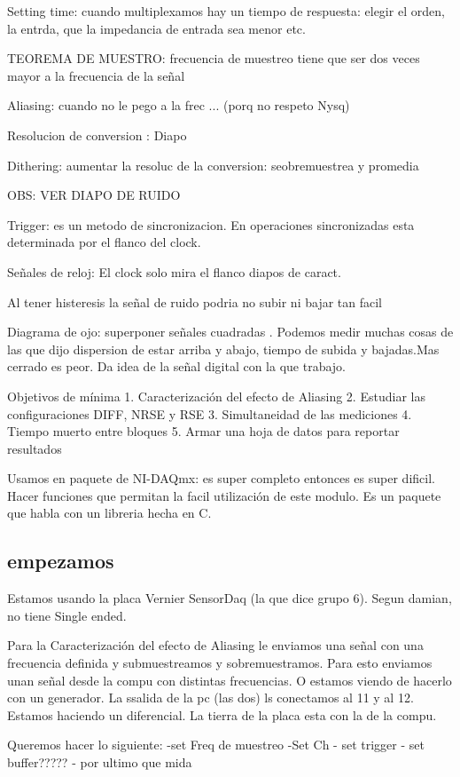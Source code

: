 \documentclass[a4paper,12pt]{article}
\begin{document}
Setting time:
cuando multiplexamos hay un tiempo de respuesta: elegir el orden, la entrda, que la impedancia de entrada sea menor etc. 

TEOREMA DE MUESTRO:
frecuencia de muestreo tiene que ser dos veces mayor a la frecuencia de la señal 

Aliasing: 
cuando no le pego a la frec ... (porq no respeto Nysq)

Resolucion de conversion :
Diapo

Dithering: 
aumentar la resoluc de la conversion: seobremuestrea y promedia 

OBS: VER DIAPO DE RUIDO 

Trigger: es un metodo de sincronizacion. En operaciones sincronizadas esta determinada por el flanco del clock. 

Señales de reloj: 
El clock solo mira el flanco 
diapos de caract. 

Al tener histeresis la señal de ruido podria no subir ni bajar tan facil 

Diagrama de ojo: superponer señales cuadradas . Podemos medir muchas cosas de las que dijo dispersion de estar arriba y abajo, tiempo de subida y bajadas.Mas cerrado es peor. Da idea de la señal digital con la que trabajo. 

Objetivos de mínima
1. Caracterización del efecto de Aliasing
2. Estudiar las configuraciones DIFF, NRSE y RSE
3. Simultaneidad de las mediciones
4. Tiempo muerto entre bloques
5. Armar una hoja de datos para reportar resultados


Usamos en paquete de NI-DAQmx: es super completo entonces es super dificil. Hacer funciones que permitan la facil utilización de este modulo. Es un paquete que habla con un libreria hecha en C. 
\subsection{empezamos}
Estamos usando la placa Vernier SensorDaq (la que dice grupo 6). Segun damian, no tiene Single ended. 

Para la Caracterización del efecto de Aliasing le enviamos una señal con una frecuencia definida y submuestreamos y sobremuestramos. Para esto enviamos unan señal desde la compu con distintas frecuencias. O estamos viendo de hacerlo con un generador.  
La ssalida de la pc (las dos) ls conectamos al 11 y al 12. Estamos haciendo un diferencial. La tierra de la placa esta con la de la compu. 

Queremos hacer lo siguiente: 
-set Freq de muestreo
-Set Ch
- set trigger
- set buffer?????
- por ultimo que mida 
\end{document}
